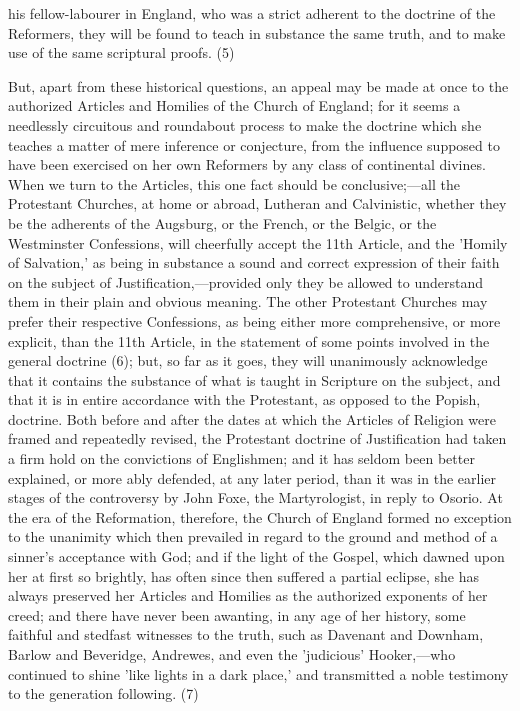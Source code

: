 \documentclass[
]{book}
\begin{document}
his fellow-labourer in England, who was a strict adherent to the doctrine of the Reformers, they will be found to teach in substance the same truth, and to make use of the same scriptural proofs. (5)

But, apart from these historical questions, an appeal may be made at once to the authorized Articles and Homilies of the Church of England; for it seems a needlessly circuitous and roundabout process to make the doctrine which she teaches a matter of mere inference or conjecture, from the influence supposed to have been exercised on her own Reformers by any class of continental divines. When we turn to the Articles, this one fact should be conclusive;---all the Protestant Churches, at home or abroad, Lutheran and Calvinistic, whether they be the adherents of the Augsburg, or the French, or the Belgic, or the Westminster Confessions, will cheerfully accept the 11th Article, and the 'Homily of Salvation,' as being in substance a sound and correct expression of their faith on the subject of Justification,---provided only they be allowed to understand them in their plain and obvious meaning. The other Protestant Churches may prefer their respective Confessions, as being either more comprehensive, or more explicit, than the 11th Article, in the statement of some points involved in the general doctrine (6); but, so far as it goes, they will unanimously acknowledge that it contains the substance of what is taught in Scripture on the subject, and that it is in entire accordance with the Protestant, as opposed to the Popish, doctrine. Both before and after the dates at which the Articles of Religion were framed and repeatedly revised, the Protestant doctrine of Justification had taken a firm hold on the convictions of Englishmen; and it has seldom been better explained, or more ably defended, at any later period, than it was in the earlier stages of the controversy by John Foxe, the Martyrologist, in reply to Osorio. At the era of the Reformation, therefore, the Church of England formed no exception to the unanimity which then prevailed in regard to the ground and method of a sinner's acceptance with God; and if the light of the Gospel, which dawned upon her at first so brightly, has often since then suffered a partial eclipse, she has always preserved her Articles and Homilies as the authorized exponents of her creed; and there have never been awanting, in any age of her history, some faithful and stedfast witnesses to the truth, such as Davenant and Downham, Barlow and Beveridge, Andrewes, and even the 'judicious' Hooker,---who continued to shine 'like lights in a dark place,' and transmitted a noble testimony to the generation following. (7)
\end{document}
